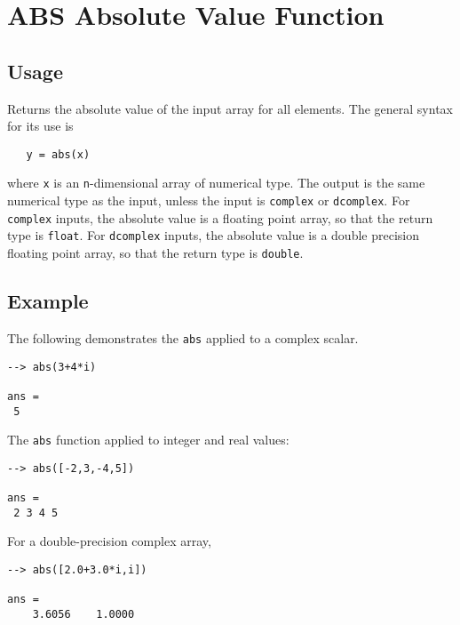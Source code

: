 \section{ABS Absolute Value Function}

\subsection{Usage}

Returns the absolute value of the input array for all elements.  The 
general syntax for its use is
\begin{verbatim}
   y = abs(x)
\end{verbatim}
where \verb|x| is an \verb|n|-dimensional array of numerical type.  The output 
is the same numerical type as the input, unless the input is \verb|complex|
or \verb|dcomplex|.  For \verb|complex| inputs, the absolute value is a floating
point array, so that the return type is \verb|float|.  For \verb|dcomplex|
inputs, the absolute value is a double precision floating point array, so that
the return type is \verb|double|.
\subsection{Example}

The following demonstrates the \verb|abs| applied to a complex scalar.
\begin{verbatim}
--> abs(3+4*i)

ans = 
 5 
\end{verbatim}
The \verb|abs| function applied to integer and real values:
\begin{verbatim}
--> abs([-2,3,-4,5])

ans = 
 2 3 4 5 
\end{verbatim}
For a double-precision complex array,
\begin{verbatim}
--> abs([2.0+3.0*i,i])

ans = 
    3.6056    1.0000 
\end{verbatim}
